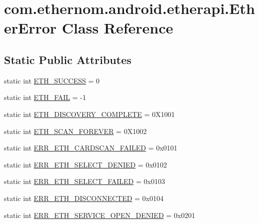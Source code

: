 \hypertarget{classcom_1_1ethernom_1_1android_1_1etherapi_1_1_ether_error}{}\section{com.\+ethernom.\+android.\+etherapi.\+Ether\+Error Class Reference}
\label{classcom_1_1ethernom_1_1android_1_1etherapi_1_1_ether_error}
\subsection*{Static Public Attributes}
\begin{DoxyCompactItemize}
\item 
static int \mbox{\hyperlink{classcom_1_1ethernom_1_1android_1_1etherapi_1_1_ether_error_a9c92acbfd73c9c3ea282a84f500b2846}{E\+T\+H\+\_\+\+S\+U\+C\+C\+E\+SS}} = 0
\item 
static int \mbox{\hyperlink{classcom_1_1ethernom_1_1android_1_1etherapi_1_1_ether_error_af564e222c98a1cbd8b10fc80a53de129}{E\+T\+H\+\_\+\+F\+A\+IL}} = -\/1
\item 
static int \mbox{\hyperlink{classcom_1_1ethernom_1_1android_1_1etherapi_1_1_ether_error_a1ef6d10d43480dbe227cd99d03beee95}{E\+T\+H\+\_\+\+D\+I\+S\+C\+O\+V\+E\+R\+Y\+\_\+\+C\+O\+M\+P\+L\+E\+TE}} = 0\+X1001
\item 
static int \mbox{\hyperlink{classcom_1_1ethernom_1_1android_1_1etherapi_1_1_ether_error_a3835b1cbf18e12c40d2e0a2a98496b44}{E\+T\+H\+\_\+\+S\+C\+A\+N\+\_\+\+F\+O\+R\+E\+V\+ER}} = 0\+X1002
\item 
static int \mbox{\hyperlink{classcom_1_1ethernom_1_1android_1_1etherapi_1_1_ether_error_ab60fd24daa6d05436abf55da67c1f1e4}{E\+R\+R\+\_\+\+E\+T\+H\+\_\+\+C\+A\+R\+D\+S\+C\+A\+N\+\_\+\+F\+A\+I\+L\+ED}} = 0x0101
\item 
static int \mbox{\hyperlink{classcom_1_1ethernom_1_1android_1_1etherapi_1_1_ether_error_ab7243d251235ee1b8e37db8dc22b466c}{E\+R\+R\+\_\+\+E\+T\+H\+\_\+\+S\+E\+L\+E\+C\+T\+\_\+\+D\+E\+N\+I\+ED}} = 0x0102
\item 
static int \mbox{\hyperlink{classcom_1_1ethernom_1_1android_1_1etherapi_1_1_ether_error_a613242d9be750d1261140b531b3e7be1}{E\+R\+R\+\_\+\+E\+T\+H\+\_\+\+S\+E\+L\+E\+C\+T\+\_\+\+F\+A\+I\+L\+ED}} = 0x0103
\item 
static int \mbox{\hyperlink{classcom_1_1ethernom_1_1android_1_1etherapi_1_1_ether_error_ab3db2fe3eaf8489812e1a24f60b8bed5}{E\+R\+R\+\_\+\+E\+T\+H\+\_\+\+D\+I\+S\+C\+O\+N\+N\+E\+C\+T\+ED}} = 0x0104
\item 
static int \mbox{\hyperlink{classcom_1_1ethernom_1_1android_1_1etherapi_1_1_ether_error_a8a2dd18c66326e4c6433feab73458111}{E\+R\+R\+\_\+\+E\+T\+H\+\_\+\+S\+E\+R\+V\+I\+C\+E\+\_\+\+O\+P\+E\+N\+\_\+\+D\+E\+N\+I\+ED}} = 0x0201
\end{DoxyCompactItemize}


